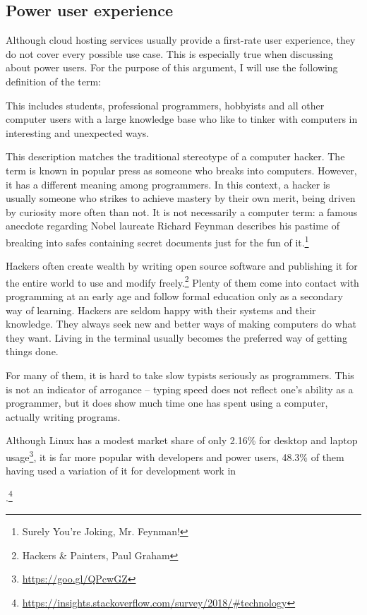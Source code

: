 \subsection{Power user experience}

Although cloud hosting services usually provide a first-rate user experience, they do not cover every possible use case. This is especially true when discussing about power users. For the purpose of this argument, I will use the following definition of the term:


This includes students, professional programmers, hobbyists and all other computer users with a large knowledge base who like to tinker with computers in interesting and unexpected ways.

This description matches the traditional stereotype of a computer hacker. The term is known in popular press as someone who breaks into computers. However, it has a different meaning among programmers. In this context, a hacker is usually someone who strikes to achieve mastery by their own merit, being driven by curiosity more often than not. It is not necessarily a computer term: a famous anecdote regarding Nobel laureate Richard Feynman describes his pastime of breaking into safes containing secret documents just for the fun of it.\footnote{Surely You're Joking, Mr. Feynman!}

Hackers often create wealth by writing open source software and publishing it for the entire world to use and modify freely.\footnote{Hackers \& Painters, Paul Graham} Plenty of them come into contact with programming at an early age and follow formal education only as a secondary way of learning. Hackers are seldom happy with their systems and their knowledge. They always seek new and better ways of making computers do what they want. Living in the terminal usually becomes the preferred way of getting things done.

For many of them, it is hard to take slow typists seriously as programmers. This is not an indicator of arrogance -- typing speed does not reflect one's ability as a programmer, but it does show much time one has spent using a computer, actually writing programs.

Although Linux has a modest market share of only 2.16\% for desktop and laptop usage\footnote{\url{https://goo.gl/QPcwGZ}}, it is far more popular with developers and power users, 48.3\% of them having used a variation of it for development work in \date{2018}.\footnote{\url{https://insights.stackoverflow.com/survey/2018/#technology}}

